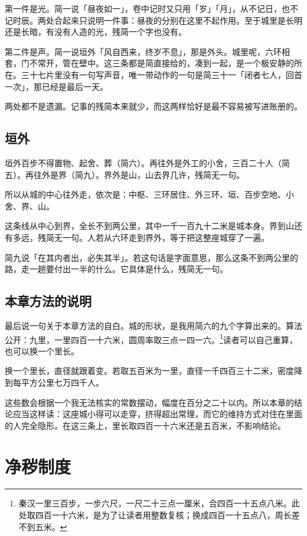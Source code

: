 第一件是光。简一说「昼夜如一」，卷中记时又只用「岁」「月」，从不记日，也不记时辰。两处合起来只说明一件事：昼夜的分别在这里不起作用。至于城里是长明还是长暗，有没有人造的光，残简一个字也没有。

第二件是声。简一说垣外「风自西来，终岁不息」，那是外头。城里呢，六环相套，门不常开，管在壁中。这三条都是简直接给的，凑到一起，是一个极安静的所在。三十七片里没有一句写声音，唯一带动作的一句是简三十一「闭者七人，回首一次」，那已经是最后一天。

两处都不是遗漏。记事的残简本来就少，而这两样恰好是最不容易被写进账册的。

\section{垣外}

垣外百步不得置物、起舍、葬（简六）。再往外是外工的小舍，三百二十人（简五）。再往外是界（简九）。界外是山，山去界几许，残简无一句。

所以从城的中心往外走，依次是：中枢、三环居住、外三环、垣、百步空地、小舍、界、山。

这条线从中心到界，全长不到两公里，其中一千一百九十二米是城本身。界到山还有多远，残简无一句。人若从六环走到界外，等于把这整座城穿了一遍。

简九说「在其内者出，必失其半」。若这句话是字面意思，那么这条不到两公里的路，走一趟要付出一半的什么。它具体是什么，残简无一句。

\section{本章方法的说明}

最后说一句关于本章方法的自白。城的形状，是我用简六的九个字算出来的。算法公开：九里，一里四百一十六米，圆周率取三点一四一六。\footnote{秦汉一里三百步，一步六尺，一尺二十三点一厘米，合四百一十五点八米。此处取四百一十六米，是为了让读者用整数复核；换成四百一十五点八，周长差不到五米。}读者可以自己重算，也可以换一个里长。

换一个里长，直径就跟着变。若取五百米为一里，直径一千四百三十二米，密度降到每平方公里七万四千人。

这些数会根据一个我无法核实的常数摆动，幅度在百分之二十以内。所以本章的结论应当这样读：这座城小得可以走穿，挤得超出常理，而它的维持方式对住在里面的人完全隐形。在这三条上，里长取四百一十六米还是五百米，不影响结论。

\chapter{净秽制度}

